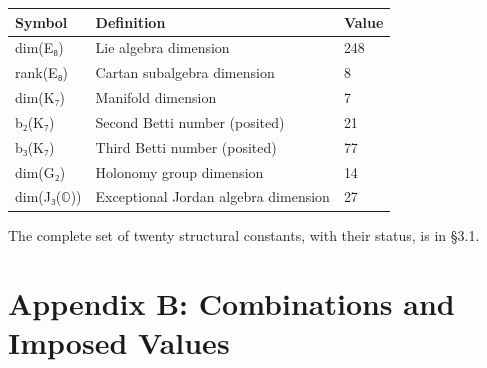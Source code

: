 \documentclass[11pt,a4paper]{article}
\begin{document}
\begin{longtable}[]{@{}lll@{}}
\toprule\noalign{}
Symbol & Definition & Value \\
\midrule\noalign{}
\endhead
\bottomrule\noalign{}
\endlastfoot
dim(E₈) & Lie algebra dimension & 248 \\
rank(E₈) & Cartan subalgebra dimension & 8 \\
dim(K₇) & Manifold dimension & 7 \\
b₂(K₇) & Second Betti number (posited) & 21 \\
b₃(K₇) & Third Betti number (posited) & 77 \\
dim(G₂) & Holonomy group dimension & 14 \\
dim(J₃(\ensuremath{\mathbb{O}})) & Exceptional Jordan algebra dimension & 27 \\
\end{longtable}

The complete set of twenty structural constants, with their status, is in §3.1.

\section{Appendix B: Combinations and Imposed Values}\label{appendix-b-combinations-and-imposed-values}
\end{document}
